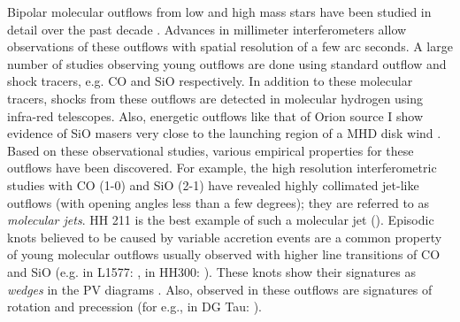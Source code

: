 \documentclass[useAMS,usenatbib]{mn2e}
\begin{document}
Bipolar molecular outflows from low and high mass stars
have been studied in detail over the past 
decade \citep[see reviews by][]{Bachiller:1996p4692, Beuther:2002p1149, Arce:2007p798,
Tafalla:2011p14051}. Advances in millimeter interferometers 
allow observations of these outflows with spatial resolution of a
few arc seconds. A large number of studies observing young
outflows are done using standard outflow and shock tracers,
e.g. CO and SiO respectively. In addition to these molecular tracers,
shocks from these outflows are detected in molecular hydrogen using
infra-red telescopes. Also, energetic outflows like that of
Orion source I show evidence of SiO masers very close to the launching
region of a MHD disk wind \citep{Goddi:2009p8571, Vaidya:2013p12777}. 
Based on these observational studies, various
empirical properties for these outflows have been discovered. 
For example, the high resolution interferometric studies with
CO (1-0) and SiO (2-1) have revealed highly collimated jet-like
outflows (with opening angles less than a few degrees); they are
referred to as {\em{molecular jets}}. HH 211 is the best example of
such a molecular jet (\citealt{Gueth:1999p4683}).
Episodic knots believed to be caused by variable accretion events are a common property
of young molecular outflows usually observed with higher line
transitions of CO and SiO (e.g. in L1577:
\citealt{Gueth:1998p14058}, in HH300: \citealt{Arce:2001p14064}). These knots show their signatures
as {\em{wedges}} in the PV diagrams \cite{Arce:2001p14065}. Also, 
observed in these outflows are signatures of rotation and
precession (for e.g., in DG Tau: \citealt{Bacciotti:2002p2084}).
%
\end{document}
